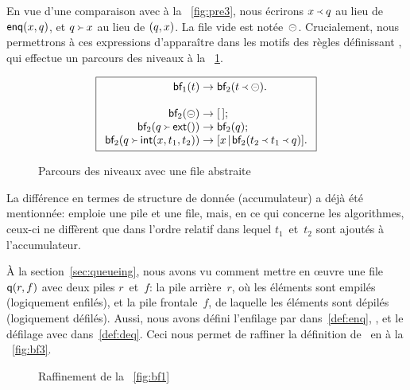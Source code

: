 En vue d'une comparaison avec
 à la
\fig~\vref{fig:pre3}, nous écrirons
\(\enq{x}{q}\) au lieu de
\(\fun{enq}(x,q)\), et
\(\deq{x}{q}\) au lieu de \(\pair{q}{x}\). La
file vide est notée~\(\emq\). Crucialement, nous
permettrons à ces expressions d'apparaître dans les motifs des règles
définissant , qui effectue
un parcours des niveaux à la \fig~\ref{fig:bf1}.
\begin{figure}
\begin{equation*}
\boxed{
\begin{array}{r@{\;}c@{\;}l}
\fun{bf}_1(t) & \rightarrow & \fun{bf}_2(\enq{t}{\emq}).\\
\\
\fun{bf}_2(\emq) & \rightarrow & \el;\\
\fun{bf}_2(\deq{\fun{ext}()}{q}) & \rightarrow & \fun{bf}_2(q);\\
\fun{bf}_2(\deq{\fun{int}(x,t_1,t_2)}{q})
  & \rightarrow & \cons{x}{\fun{bf}_2(\enq{t_2}{\enq{t_1}{q}})}.
\end{array}}
\end{equation*}
\caption{Parcours des niveaux avec une file abstraite}
\label{fig:bf1}
\end{figure}
La différence en termes de structure de donnée (accumulateur) a déjà
été mentionnée: 
emploie une pile et  une
file, mais, en ce qui concerne les algorithmes, ceux-ci ne diffèrent
que dans l'ordre relatif dans lequel \(t_1\)~et~\(t_2\) sont ajoutés à
l'accumulateur.

À la section~\ref{sec:queueing}, nous avons vu comment mettre en
œuvre une file \(\fun{q}(r,f)\) avec deux piles \(r\)~et~\(f\):
 la pile arrière~\(r\), où les éléments sont
empilés (logiquement enfilés), et la pile frontale~\(f\), de laquelle
les éléments sont dépilés (logiquement défilés). Aussi, nous avons
défini l'enfilage par 
dans~\eqref{def:enq}, , et le défilage avec
 dans~\eqref{def:deq}. Ceci nous
permet de raffiner la définition
de~ en
 à la \fig~\vref{fig:bf3}.
\begin{figure}
\abovedisplayskip=0pt
\belowdisplayskip=0pt
\centering
{}
\caption{Raffinement de la \fig~\vref{fig:bf1}}
\label{fig:bf3}
\end{figure}

